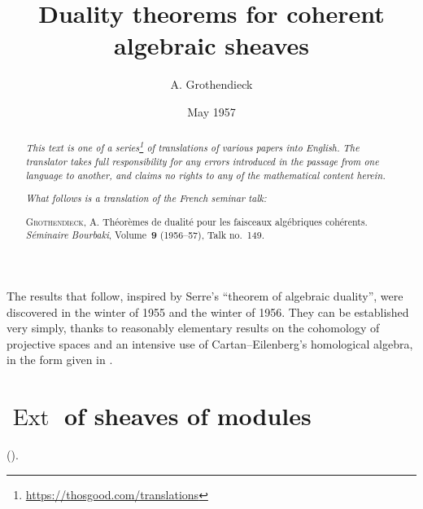 \documentclass{article}
\title{Duality theorems for coherent algebraic sheaves}
\author{A. Grothendieck}
\date{May 1957}
\newcommand{\doctype}{French seminar talk}
\newcommand{\origcit}{%
  \textsc{Grothendieck, A.}
  Th\'{e}or\`{e}mes de dualit\'{e} pour les faisceaux alg\'{e}briques coh\'{e}rents.
  \emph{S\'{e}minaire Bourbaki}, Volume~\textbf{9} (1956--57), Talk no.~149.%
}
\theoremstyle{plain}
\theoremstyle{definition}
\DeclareMathOperator{\Ext}{Ext}
\newcommand{\oldpage}[1]{\marginpar{\footnotesize$\Big\vert$ \textit{p.~#1}}}
\begin{document}
\maketitle
\thispagestyle{fancy}

\renewcommand{\abstractname}{Translator's note.}

\begin{abstract}
  \renewcommand*{\thefootnote}{\fnsymbol{footnote}}
  \emph{This text is one of a series\footnote{\url{https://thosgood.com/translations}} of translations of various papers into English.}
  \emph{The translator takes full responsibility for any errors introduced in the passage from one language to another, and claims no rights to any of the mathematical content herein.}

  \medskip
  
  \emph{What follows is a translation of the \doctype:}

  \medskip\noindent
  \origcit
\end{abstract}

\setcounter{footnote}{0}

\tableofcontents
\bigskip



\oldpage{149-01}
The results that follow, inspired by Serre's ``theorem of algebraic duality'', were discovered in the winter of 1955 and the winter of 1956.
They can be established very simply, thanks to reasonably elementary results on the cohomology of projective spaces \cite{3} and an intensive use of Cartan--Eilenberg's homological algebra, in the form given in \cite{2}.


\section{\texorpdfstring{$\Ext$}{Ext} of sheaves of modules}
\label{section1}

(\cite[chap.~3 and 4]{2}).
\end{document}
